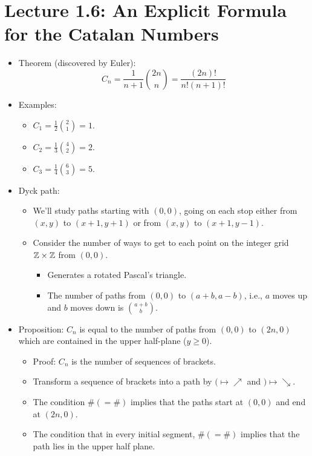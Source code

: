 \documentclass[../apprentice.tex]{subfiles}
\begin{document}
\section{Lecture 1.6: An Explicit Formula for the Catalan Numbers}
\begin{itemize}
    \item {}Theorem (discovered by Euler):
    \begin{equation*}
        C_n = \frac{1}{n+1}\binom{2n}{n}=\frac{(2n)!}{n!(n+1)!}
    \end{equation*}
    \item Examples:
    \begin{itemize}
        \item $C_1=\frac{1}{2}\binom{2}{1}=1$.
        \item $C_2=\frac{1}{3}\binom{4}{2}=2$.
        \item $C_3=\frac{1}{4}\binom{6}{3}=5$.
    \end{itemize}
    \item Dyck path:
    \begin{itemize}
        \item We'll study paths starting with $(0,0)$, going on each stop either from $(x,y)$ to $(x+1,y+1)$ or from $(x,y)$ to $(x+1,y-1)$.
        \item Consider the number of ways to get to each point on the integer grid $\mathbb{Z}\times\mathbb{Z}$ from $(0,0)$.
        \begin{itemize}
            \item Generates a rotated Pascal's triangle.
            \item The number of paths from $(0,0)$ to $(a+b,a-b)$, i.e., $a$ moves up and $b$ moves down is $\binom{a+b}{b}$.
        \end{itemize}
    \end{itemize}
    \item Proposition: $C_n$ is equal to the number of paths from $(0,0)$ to $(2n,0)$ which are contained in the upper half-plane ($y\geq 0$).
    \begin{itemize}
        \item Proof: $C_n$ is the number of sequences of brackets.
        \item Transform a sequence of brackets into a path by $(\mapsto\nearrow$ and $)\mapsto\searrow$.
        \item The condition $\#(=\#)$ implies that the paths start at $(0,0)$ and end at $(2n,0)$.
        \item The condition that in every initial segment, $\#(=\#)$ implies that the path lies in the upper half plane.

\end{itemize}
\end{itemize}
\end{document}
